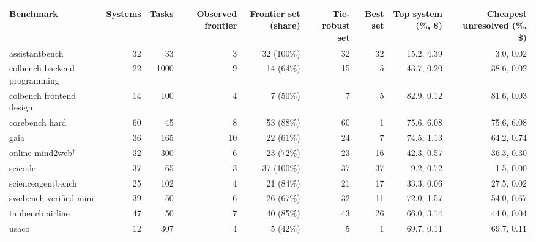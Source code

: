\begin{tabular}{lrrrrrrrr}
\toprule
Benchmark & Systems & Tasks & Observed frontier & Frontier set (share) & Tie-robust set & Best set & Top system (\%, \$) & Cheapest unresolved (\%, \$) \\
\midrule
assistantbench & 32 & 33 & 3 & 32 (100\%) & 32 & 32 & 15.2, 4.39 & 3.0, 0.02 \\
colbench backend programming & 22 & 1000 & 9 & 14 (64\%) & 15 & 5 & 43.7, 0.20 & 38.6, 0.02 \\
colbench frontend design & 14 & 100 & 4 & 7 (50\%) & 7 & 5 & 82.9, 0.12 & 81.6, 0.03 \\
corebench hard & 60 & 45 & 8 & 53 (88\%) & 60 & 1 & 75.6, 6.08 & 75.6, 6.08 \\
gaia & 36 & 165 & 10 & 22 (61\%) & 24 & 7 & 74.5, 1.13 & 64.2, 0.74 \\
online mind2web$^{\dagger}$ & 32 & 300 & 6 & 23 (72\%) & 23 & 16 & 42.3, 0.57 & 36.3, 0.30 \\
scicode & 37 & 65 & 3 & 37 (100\%) & 37 & 37 & 9.2, 0.72 & 1.5, 0.00 \\
scienceagentbench & 25 & 102 & 4 & 21 (84\%) & 21 & 17 & 33.3, 0.06 & 27.5, 0.02 \\
swebench verified mini & 39 & 50 & 6 & 26 (67\%) & 32 & 11 & 72.0, 1.57 & 54.0, 0.67 \\
taubench airline & 47 & 50 & 7 & 40 (85\%) & 43 & 26 & 66.0, 3.14 & 44.0, 0.04 \\
usaco & 12 & 307 & 4 & 5 (42\%) & 5 & 1 & 69.7, 0.11 & 69.7, 0.11 \\
\bottomrule
\end{tabular}

